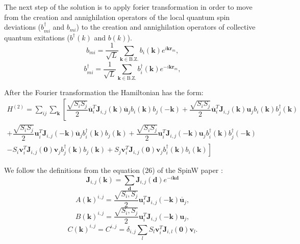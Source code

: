 \documentclass[a4paper,12pt]{article}
\begin{document}
    The next step of the solution is to apply forier transformation in order to move from the creation and annighilation operators 
    of the local quantum spin deviations ($b^{\dag}_{mi}$ and $b_{mi}$) 
    to the creation and annighilation operators of collective quantum exitations ($b^{\dag}(k)$ and $b(k)$).
    \begin{equation}
        b_{mi} = \dfrac{1}{\sqrt{L}}\sum_{\boldsymbol{k} \in \text{B.Z.}} b_i(\boldsymbol{k})e^{i\boldsymbol{k}\boldsymbol{r}_m},
    \end{equation}
    \begin{equation}
        b^{\dag}_{mi} = \dfrac{1}{\sqrt{L}}\sum_{\boldsymbol{k} \in \text{B.Z.}} b^{\dag}_i(\boldsymbol{k})e^{-i\boldsymbol{k}\boldsymbol{r}_m},
    \end{equation}

    After the Fourier transformation the Hamiltonian has the form:
    \begin{multline}
        H^{(2)} = \sum_{ij}\sum_{\boldsymbol{k}}\left[\dfrac{\sqrt{S_i S_j}}{2}\overline{\boldsymbol{u}}^T_i\boldsymbol{J}_{i,j}(\boldsymbol{k})\overline{\boldsymbol{u}}_jb_{i}(\boldsymbol{k})b_{j}(-\boldsymbol{k}) +
        \dfrac{\sqrt{S_i S_j}}{2} \overline{\boldsymbol{u}}^T_i\boldsymbol{J}_{i,j}(\boldsymbol{k})\boldsymbol{u}_j b_{i}(\boldsymbol{k})b^{\dag}_{j}(\boldsymbol{k})\right. \\+ 
        \dfrac{\sqrt{S_i S_j}}{2}\boldsymbol{u}^T_i\boldsymbol{J}_{i,j}(-\boldsymbol{k})\overline{\boldsymbol{u}}_jb^{\dag}_{i}(\boldsymbol{k})b_{j}(\boldsymbol{k}) +
        \dfrac{\sqrt{S_i S_j}}{2}\boldsymbol{u}^T_i\boldsymbol{J}_{i,j}(-\boldsymbol{k})\boldsymbol{u}_jb^{\dag}_{i}(\boldsymbol{k})b^{\dag}_{j}(-\boldsymbol{k}) \\-
        \left.S_i\boldsymbol{v}^T_i\boldsymbol{J}_{i,j}(\boldsymbol{0})\boldsymbol{v}_jb^{\dag}_{j}(\boldsymbol{k})b_{j}(\boldsymbol{k}) + 
        S_j\boldsymbol{v}^T_i\boldsymbol{J}_{i,j}(\boldsymbol{0})\boldsymbol{v}_jb^{\dag}_{i}(\boldsymbol{k})b_{i}(\boldsymbol{k})\right]
    \end{multline}

    We follow the definitions from the equation (26) of the SpinW paper \cite{toth2015linear}:
    \begin{equation}
        \boldsymbol{J}_{i,j}(\boldsymbol{k}) = \sum_{\boldsymbol{d}}\boldsymbol{J}_{i,j}(\boldsymbol{d})e^{-i\boldsymbol{k}\boldsymbol{d}}
    \end{equation}
    \begin{equation}
        A(\boldsymbol{k})^{i,j} = \dfrac{\sqrt{S_i, S_j}}{2}\boldsymbol{u}^T_i\boldsymbol{J}_{i,j}(-\boldsymbol{k})\overline{\boldsymbol{u}}_j,
    \end{equation}
    \begin{equation}
        B(\boldsymbol{k})^{i,j} = \dfrac{\sqrt{S_i, S_j}}{2}\boldsymbol{u}^T_i\boldsymbol{J}_{i,j}(-\boldsymbol{k})\boldsymbol{u}_j,
    \end{equation}
    \begin{equation}
        C(\boldsymbol{k})^{i,j} = C^{i,j} = \delta_{i,j}\sum_{l}S_l \boldsymbol{v}^T_i\boldsymbol{J}_{i, l}(\boldsymbol{0})\boldsymbol{v}_l.
    \end{equation}
\end{document}
